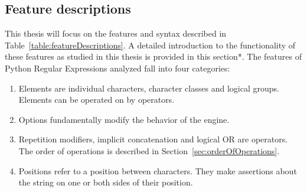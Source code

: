 \subsection{Feature descriptions}



This thesis will focus on the features and syntax described in Table~\ref{table:featureDescriptions}.  A detailed introduction to the functionality of these features as studied in this thesis is provided in this section*.  The features of Python Regular Expressions analyzed fall into four categories:

\begin{enumerate} \itemsep -1pt
\item{Elements are individual characters, character classes and logical groups.  Elements can be operated on by operators.}
\item{Options fundamentally modify the behavior of the engine.}
\item{Repetition modifiers, implicit concatenation and logical OR are operators. The order of operations is described in Section~\ref{sec:orderOfOperations}}.
\item{Positions refer to a position between characters.  They make assertions about the string on one or both sides of their position.}
\end{enumerate}
